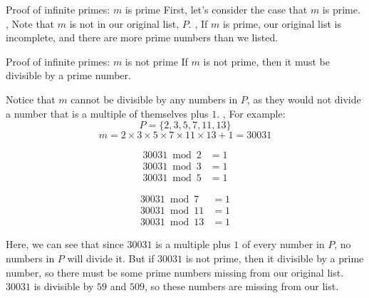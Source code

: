 \begin{namedframe}{Proof of infinite primes: $m$ is prime}
	First, let's consider the case that $m$ is prime.
	\sep
	Note that $m$ is not in our original list, $P$.
	\sep
	If $m$ is prime, our original list is incomplete, and there are more prime numbers than we listed.
\end{namedframe}
\begin{namedframe}{Proof of infinite primes: $m$ is not prime}
	If $m$ is not prime, then it must be divisible by a prime number.

	Notice that $m$ cannot be divisible by any numbers in $P$, as they would not divide a number that is a multiple of themselves plus $1$.
	\sep
	For example:
	\vspace{-1ex}
	\[P = \{2,3,5,7,11,13\}\]
	\vspace{-3ex}
	\[m = 2 \times 3 \times 5 \times 7 \times 11 \times 13 + 1 = \num{30031}\]
	\varsep{-5ex}
	\begin{center}
		\begin{minipage}{0.45\textwidth}
			\begin{align*}
				\num{30031} \bmod 2 &= 1\\
				\num{30031} \bmod 3 &= 1\\
				\num{30031} \bmod 5 &= 1
			\end{align*}
		\end{minipage}
		\begin{minipage}{0.45\textwidth}
			\begin{align*}
				\num{30031} \bmod 7  &= 1\\
				\num{30031} \bmod 11 &= 1\\
				\num{30031} \bmod 13 &= 1
			\end{align*}
		\end{minipage}
	\end{center}
	\varvsep{-2ex}
	Here, we can see that since $\num{30031}$ is a multiple plus $1$ of every number in $P$, no numbers in $P$ will divide it.
	\pause
	But if $\num{30031}$ is not prime, then it divisible by a prime number, so there must be some prime numbers missing from our original list.
	\pause
	$\num{30031}$ is divisible by $59$ and $509$, so these numbers are missing from our list.
\end{namedframe}
